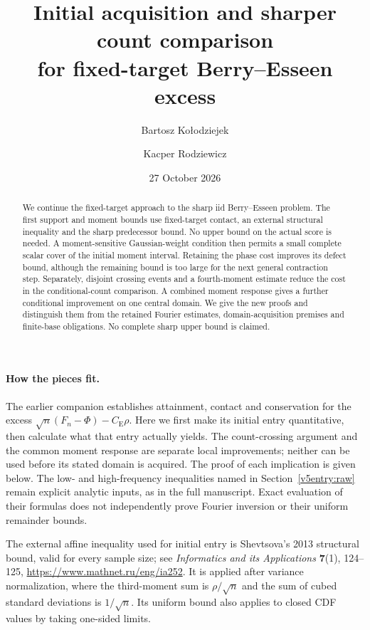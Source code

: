 \documentclass[11pt,a4paper]{article}
\title{Initial acquisition and sharper count comparison\\
for fixed-target Berry--Esseen excess}
\author{Bartosz Ko{\l}odziejek \and Kacper Rodziewicz}
\date{27 October 2026}
\newcommand{\CE}{C_{\mathrm E}}
\begin{document}
\maketitle
\begin{abstract}
We continue the fixed-target approach to the sharp iid Berry--Esseen
problem. The first support and moment bounds use fixed-target contact,
an external structural inequality and the sharp predecessor bound.
No upper bound on the actual score is needed. A moment-sensitive
Gaussian-weight condition then permits a small
complete scalar cover of the initial moment interval. Retaining the phase
cost improves its defect bound, although the remaining bound is too large
for the next general contraction step. Separately, disjoint crossing events
and a fourth-moment estimate reduce the cost in the conditional-count
comparison. A combined moment response gives a further conditional
improvement on one central domain. We give the new proofs and distinguish
them from the retained Fourier estimates, domain-acquisition premises and
finite-base obligations. No complete sharp upper bound is claimed.
\end{abstract}

\paragraph{How the pieces fit.}
The earlier companion establishes attainment, contact and conservation for
the excess $\sqrt n(F_n-\Phi)-\CE\rho$. Here we first make its initial
entry quantitative, then calculate what that entry actually yields. The
count-crossing argument and the common moment response are separate local
improvements; neither can be used before its stated domain is acquired.
The proof of each implication is given below. The low- and high-frequency
inequalities named in Section~\ref{v5entry:raw} remain explicit analytic
inputs, as in the full manuscript. Exact evaluation of their formulas does
not independently prove Fourier inversion or their uniform remainder bounds.

The external affine inequality used for initial entry is Shevtsova's
2013 structural bound, valid for every sample size; see
\emph{Informatics and its Applications} \textbf{7}(1), 124--125,
\url{https://www.mathnet.ru/eng/ia252}. It is applied after variance
normalization, where the third-moment sum is $\rho/\sqrt n$ and the sum of
cubed standard deviations is $1/\sqrt n$. Its uniform bound also applies
to closed CDF values by taking one-sided limits.
\end{document}
